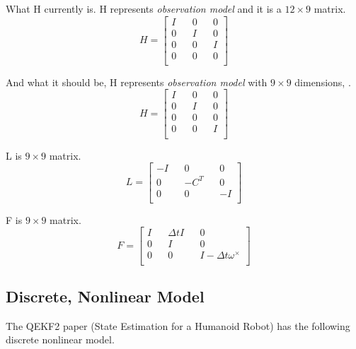\documentclass[letterpaper, 10 pt, conference]{ieeeconf}  %
\newcommand{\transpose}[1]{\ensuremath{#1^{\scriptscriptstyle T}}}
\begin{document}
What H currently is.
H represents \textit{observation model} and it is a \(12 \times 9\) matrix.
\begin{equation}
H =
\begin{bmatrix}
        I && 0 && 0  \\
        0 && I && 0  \\
        0 && 0 && I  \\
        0 && 0 && 0  \\
\end{bmatrix}
\end{equation}

And what it should be,
H represents \textit{observation model} with \(9 \times 9\) dimensions, .
\begin{equation}
H =
\begin{bmatrix}
        I && 0 && 0  \\
        0 && I && 0  \\
        0 && 0 && 0  \\
        0 && 0 && I  \\
\end{bmatrix}
\end{equation}

L is \(9 \times 9\) matrix.
\begin{equation}
L =
\begin{bmatrix}
        -I && 0 && 0  \\
        0 && -\transpose{C} && 0  \\
        0 && 0 && -I  \\
\end{bmatrix}
\end{equation}


F is \(9 \times 9\) matrix.
\begin{equation}
F =
\begin{bmatrix}
        I && \Delta t   I && 0  \\
        0 && I && 0  \\
        0 && 0 && I- \Delta t \omega^{\times}  \\
\end{bmatrix}
\end{equation}

\subsection{Discrete, Nonlinear Model}
The QEKF2 paper (State Estimation for a Humanoid Robot) has the following discrete
nonlinear model.
\end{document}
